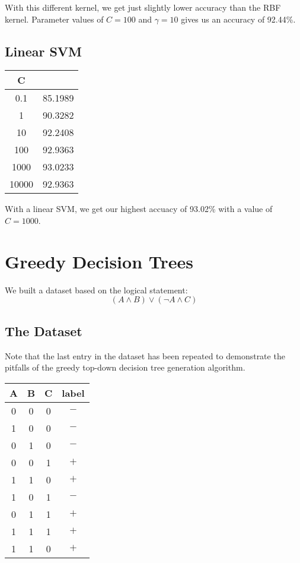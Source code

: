 \documentclass[11pt]{article}
\begin{document}
        With this different kernel, we get just slightly lower accuracy than the RBF kernel. Parameter values of $C = 100$ and $\gamma = 10$ gives us an accuracy of 92.44\%. 
        
\subsection{Linear SVM}

        \begin{center}
        \begin{tabular}{ |c|c| } 
             \hline
             C & \\
             \hline
             0.1 & 85.1989\\
             \hline
             1 & 90.3282\\
             \hline
             10 & 92.2408\\
             \hline
             100 & 92.9363\\
             \hline
             1000 & 93.0233\\
             \hline
             10000 & 92.9363\\
             \hline
        \end{tabular}
        \end{center}

	With a linear SVM, we get our highest accuacy of 93.02\% with a value of $C = 1000$.
\pagebreak
\section{Greedy Decision Trees}
We built a dataset based on the logical statement:
\begin{equation}
(A \land B) \lor (\neg A \land C)
\end{equation}
\subsection{The Dataset}
Note that the last entry in the dataset has been repeated to demonstrate the pitfalls of the greedy top-down decision tree generation algorithm.
\begin{center}
        \begin{tabular}{ |c|c|c|c| } 
             \hline
             A & B & C & label\\
             \hline
             0 & 0 & 0 & $-$\\
             \hline
             1 & 0 & 0 & $-$\\
             \hline
             0 & 1 & 0 & $-$\\
             \hline
             0 & 0 & 1 & $+$\\
             \hline
             1 & 1 & 0 & $+$\\
             \hline
             1 & 0 & 1 & $-$\\
             \hline
             0 & 1 & 1 & $+$\\
             \hline
             1 & 1 & 1 & $+$\\
             \hline
             1 & 1 & 0 & $+$\\
             \hline
        \end{tabular}
\end{center}
\end{document}
